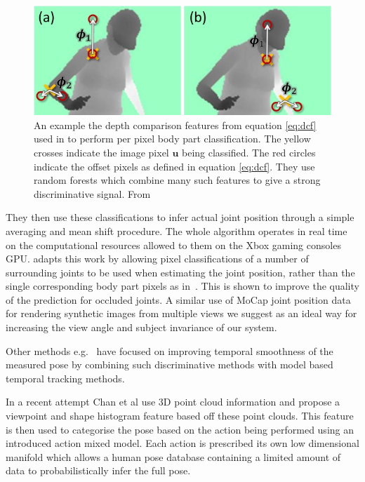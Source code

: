 \documentclass[11pt]{article} %
\begin{document}
\begin{figure}
\centering
\includegraphics*[width=0.6\linewidth,clip]{kinectFeature}
\caption{An example the depth comparison features from equation \ref{eq:dcf} used in \cite{Blake2011} to perform per pixel body part classification. The yellow crosses indicate the image pixel $\boldsymbol{u}$ being classified. The red circles indicate the offset pixels as defined in equation \ref{eq:dcf}. They use random forests which combine many such features to give a strong discriminative signal. From~\cite{Blake2011} \label{fig:dcf}  } 
\end{figure}

They then use these classifications to infer actual joint position through a simple averaging and mean shift procedure. The whole algorithm operates in real time on the computational resources allowed to them on the Xbox gaming consoles GPU. \cite{Shotton2013a} adapts this work by allowing pixel classifications of a number of surrounding joints to be used when estimating the joint position, rather than the single corresponding body part pixels as in~\cite{Blake2011}. This is shown to improve the quality of the prediction for occluded joints. A similar use of MoCap joint position data for rendering synthetic images from multiple views we suggest as an ideal way for increasing the view angle and subject invariance of our system.


Other methods e.g.~\cite{Ye2011,Wei2011,Baak2011,Zhu2008} have focused on improving temporal smoothness of the measured pose by combining such discriminative methods with model based temporal tracking methods. 

In a recent attempt Chan et al \cite{Chan2014} use 3D point cloud information and propose a viewpoint and shape histogram feature based off these point clouds. This feature is then used to categorise the pose based on the action being performed using an introduced action mixed model. Each action is prescribed its own low dimensional manifold which allows a human pose database containing a limited amount of data to probabilistically infer the full pose.
\end{document}
